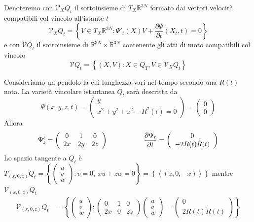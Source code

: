 \documentclass[11pt,a4paper,twoside]{book}
\newenvironment{esempio}[1][Esempio]{ 
  \begin{center}\begin{tcolorbox}[
  title={#1:\\},
  width=0.9\linewidth,
  flush right,
  enhanced jigsaw, 
  colback=white, 
  frame hidden, 
  sharpish corners, arc=3mm,
  borderline west = {1pt}{0pt}{gray},
  borderline south = {1pt}{0pt}{gray},
  coltitle=black, 
  fonttitle=\small\bfseries, 
  attach title to upper, 
  breakable,
  top=2.5pt, bottom=0.3pt]\small
  }{
 \normalsize \end{tcolorbox}\end{center}
}
\theoremstyle{esss}
\theoremstyle{dotless}
\numberwithin{equation}{section} %
\begin{document}
Denoteremo con $\mathcal{V}_XQ_t$ il sottoinsieme di $T_X\mathbb{R}^{3N}$ formato dai vettori velocità compatibili col vincolo all'istante $t$
\[
\mathcal{V}_XQ_t=\left\{  V\in T_X\mathbb{R}^{3N} : \Psi'_t(X)V+\dfrac{\partial \Psi}{\partial t}(X_t,t)=0\right\}
\]
e con $\mathcal{V}Q_t$ il sottoinsieme di $\mathbb{R}^{3N}\times\mathbb{R}^{3N}$   contenente gli atti di moto compatibili col vincolo
\[
\mathcal{V}Q_t=\left\{  (X,V) : X\in Q_T , V\in\mathcal{V}_XQ_t \right\}
\]
\begin{esempio}[Pendolo di lunghezza variabile]
Consideriamo un pendolo la cui lunghezza vari nel tempo secondo una $R(t)$ nota. La varietà vincolare istantanea $Q_t$ sarà descritta da
\[
\Psi(x,y,z,t)=\left(\begin{array}{c} y \\ x^2+y^2+z^2-R^2(t)=0 \end{array}\right)=\left(\begin{array}{c} 0 \\ 0 \end{array} \right)
\] 
Allora
\[
\Psi'_t=\left(\begin{array}{ccc} 0 & 1 & 0 \\ 2x & 2y & 2z \end{array}\right)
\hspace{0.15\linewidth} \dfrac{\partial \Psi_t}{\partial t} =\left(\begin{array}{c} 0 \\ -2R(t)\dot{R}(t) \end{array}\right)
\]
Lo spazio tangente a $Q_t$ è $T_{(x,0,z)}Q_t=\left\{ \left(\begin{array}{c} u \\ v \\ w \end{array} \right) : v=0,\> xu + zw=0 \right\} = \left\{ \left\langle(z,0,-x)\right\rangle \right\}$ mentre $\mathcal{V}_{(x,0,z)}Q_t$ 
\begin{align*}
\mathcal{V}_{(x,0,z)}Q_t & =\left\{ \left(\begin{array}{c} u\\v\\w\end{array}\right) : \left(\begin{array}{ccc} 0 & 1 & 0 \\ 2x & 0 & 2z \end{array}\right) \left(\begin{array}{c} u \\ v \\ w \end{array}\right) = \left(\begin{array}{c} 0 \\ 2R(t)\dot{R}(t) \end{array}\right)\right\} \\

\end{align*}
\end{esempio}
\end{document}
